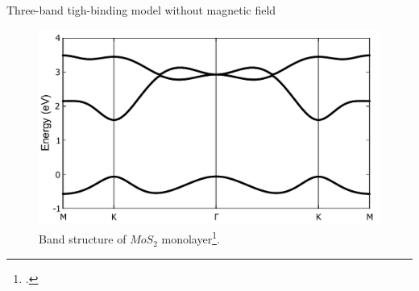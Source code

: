 \documentclass[aspectratio=169,compress,x11names]{beamer}
\begin{document}
	\begin{frame}{Three-band tigh-binding model without magnetic field}
		\begin{figure}
			\centering
			\includegraphics[width=0.65\linewidth]{./pic/bandstructure.pdf}
			\caption{Band structure of $MoS_{2}$ monolayer\footcite{liu_three-band_2013}.}
		\end{figure}
	\end{frame}
\end{document}
